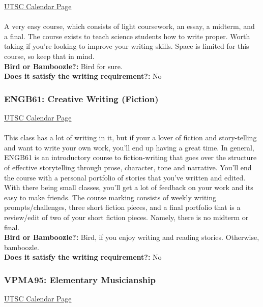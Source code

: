\documentclass[11pt]{article}
\begin{document}
\href{https://utsc.calendar.utoronto.ca/course/engb02h3}{UTSC Calendar Page}\\\\

A very easy course, which consists of light coursework, an essay, a midterm, and a final.  The course exists to teach science students how to write proper.  Worth taking if you're looking to improve your writing skills.  Space is limited for this course, so keep that in mind.\\

\textbf{Bird or Bamboozle?:} Bird for sure.\\

\textbf{Does it satisfy the writing requirement?:} No

\subsubsection{ENGB61: Creative Writing (Fiction)}

\href{https://utsc.calendar.utoronto.ca/course/engb61h3}{UTSC Calendar Page}\\\\

This class has a lot of writing in it, but if your a lover of fiction and story-telling and want to write your own work, you'll end up having a great time. In general, ENGB61 is an introductory course to fiction-writing that goes over the structure of effective storytelling   through prose, character, tone and narrative. You'll end the course with a personal portfolio of stories that you've written and edited. With there being small classes, you'll get a lot of feedback on your work and its easy to make friends. The course marking consists of weekly writing prompts/challenges, three short fiction pieces, and a final portfolio that is a review/edit of two of your short fiction pieces. Namely, there is no midterm or final. \\

\textbf{Bird or Bamboozle?:} Bird, if you enjoy writing and reading stories. Otherwise, bamboozle.\\

\textbf{Does it satisfy the writing requirement?:} No

\subsubsection{VPMA95: Elementary Musicianship}

\href{https://utsc.calendar.utoronto.ca/course/VPMA95H3}{UTSC Calendar Page}\\\\
\end{document}

